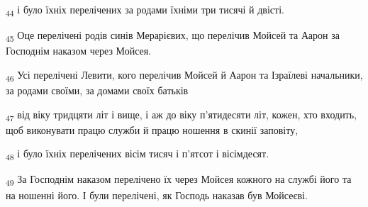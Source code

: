 \begin{tcolorbox}
\textsubscript{44} і було їхніх перелічених за родами їхніми три тисячі й двісті.
\end{tcolorbox}
\begin{tcolorbox}
\textsubscript{45} Оце перелічені родів синів Мерарієвих, що перелічив Мойсей та Аарон за Господнім наказом через Мойсея.
\end{tcolorbox}
\begin{tcolorbox}
\textsubscript{46} Усі перелічені Левити, кого перелічив Мойсей й Аарон та Ізраїлеві начальники, за родами своїми, за домами своїх батьків
\end{tcolorbox}
\begin{tcolorbox}
\textsubscript{47} від віку тридцяти літ і вище, і аж до віку п'ятидесяти літ, кожен, хто входить, щоб виконувати працю служби й працю ношення в скинії заповіту,
\end{tcolorbox}
\begin{tcolorbox}
\textsubscript{48} і було їхніх перелічених вісім тисяч і п'ятсот і вісімдесят.
\end{tcolorbox}
\begin{tcolorbox}
\textsubscript{49} За Господнім наказом перелічено їх через Мойсея кожного на службі його та на ношенні його. І були перелічені, як Господь наказав був Мойсеєві.
\end{tcolorbox}
